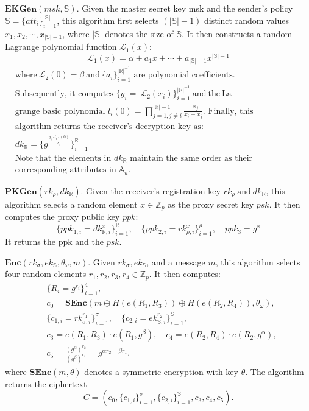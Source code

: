 \documentclass[runningheads]{llncs}
\begin{document}
$\textbf{EKGen}( msk, \mathbb{S} ) .$ Given the master secret key msk and the sender's policy $\mathbb{S}=\{att_i\}_{i=1}^{|\mathbb{S}|}$, this algorithm first selects $(|\mathbb{S}|-1)$ distinct random values $x_1,x_2,\cdots,x_{|\mathbb{S}|-1}$, where $|\mathbb{S}|$ denotes the size of $\mathbb{S}.$ It then constructs a random Lagrange polynomial function $\mathcal{L}_1(x):$
$$\mathcal{L}_1(x)=\alpha+a_1x+\cdots+a_{|\mathbb{S}|-1}x^{|\mathbb{S}|-1}$$
$\begin{aligned}&\mathrm{where~}\mathcal{L}_2(0)=\beta\mathrm{~and~}\{a_i\}_{i=1}^{|\mathbb{R}|^{-1}}\text{ are polynomial coefficients.}\\&\text{Subsequently, it computes }\{y_i=\mathrm{~}\mathcal{L}_2(x_i)\}_{i=1}^{|\mathbb{R}|^{-1}}\mathrm{~and~the~La-}\\&\text{grange basic polynomial }l_i(0)=\prod_{j=1,j\neq i}^{|\mathbb{R}|-1}\frac{-x_j}{x_i-x_j}.\text{ Finally, this}\\&\text{algorithm returns the receiver's decryption key as:}\\&dk_{\mathbb{R}}=\{g^{\frac{y_i\cdot l_i\cdot(0)}{s_i}}\}_{i=1}^{\mathbb{R}}\\&\text{Note that the elements in }dk_{\mathbb{R}}\text{ maintain the same order as their}\\&\text{corresponding attributes in }\mathbb{A}_u.\end{aligned}$

$\mathbf{PKGen}(rk_\rho,dk_\mathbb{R})$. Given the receiver's registration key $rk_\rho\mathrm{~and~}dk_\mathbb{R}$, this algorithm selects a random element $x\in\mathbb{Z}_p$
as the proxy secret key $psk.$ It then computes the proxy public key $ppk$:
$$\{ppk_{1,i}=dk_{\mathbb{R},i}^x\}_{i=1}^\mathbb{R},\quad\{ppk_{2,i}=rk_{\rho,i}^x\}_{i=1}^\rho,\quad ppk_3=g^x$$
It returns the ppk and the $psk.$

$\mathbf{Enc}(rk_\sigma,ek_{\mathbb{S}},\theta_\omega,m).$ Given $rk_\sigma,ek_\mathbb{S}$, and a message $m$, this algorithm selects four random elements $r_1,r_2,r_3,r_4\in\mathbb{Z}_p.$ It then computes:
$$\begin{aligned}&\{R_i=g^{r_i}\}_{i=1}^4,\\&c_0=\mathbf{SEnc}(m\oplus H(e(R_1,R_3))\oplus H(e(R_2,R_4)),\theta_\omega),\\&\{c_{1,i}=rk_{\sigma,i}^{r_1}\}_{i=1}^\sigma,\quad\{c_{2,i}=ek_{\mathbb{S},i}^{r_2}\}_{i=1}^\mathbb{S},\\&c_3=e(R_1,R_3)\cdot e(R_1,g^\beta),\quad c_4=e(R_2,R_4)\cdot e(R_2,g^\alpha),\\&c_5=\frac{(g^\alpha)^{r_2}}{(g^\beta)^{r_1}}=g^{\alpha r_2-\beta r_1}.\end{aligned}$$
where $\textbf{SEnc}( m, \theta )$ denotes a symmetric encryption with key $\theta .$ The algorithm returns the ciphertext
$$C = (c_0,\{c_{1,i}\}_{i=1}^\sigma,\{c_{2,i}\}_{i=1}^\mathbb{S},c_3,c_4,c_5).$$
\end{document}
